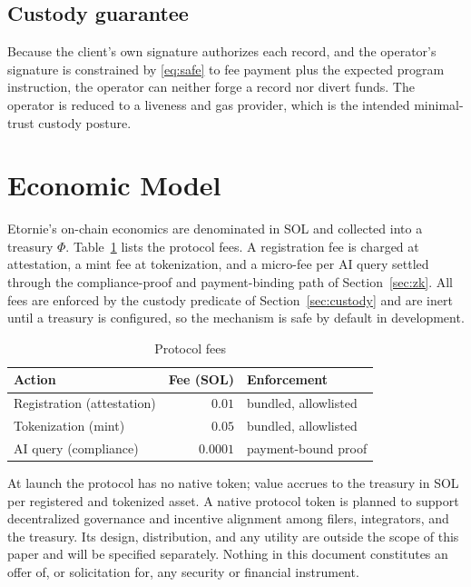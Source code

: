 \documentclass[conference]{IEEEtran}
\begin{document}
\subsection{Custody guarantee}

Because the client's own signature authorizes each record, and the operator's
signature is constrained by \eqref{eq:safe} to fee payment plus the expected
program instruction, the operator can neither forge a record nor divert funds.
The operator is reduced to a liveness and gas provider, which is the intended
minimal-trust custody posture.

\section{Economic Model}
\label{sec:econ}

Etornie's on-chain economics are denominated in SOL and collected into a
treasury $\Phi$. Table~\ref{tab:fees} lists the protocol fees. A registration
fee is charged at attestation, a mint fee at tokenization, and a micro-fee
per AI query settled through the compliance-proof and payment-binding path of
Section~\ref{sec:zk}. All fees are enforced by the custody predicate of
Section~\ref{sec:custody} and are inert until a treasury is configured, so the
mechanism is safe by default in development.

\begin{table}[t]
\caption{Protocol fees}
\label{tab:fees}
\centering
\begin{tabular}{@{}lrl@{}}
\toprule
Action & Fee (SOL) & Enforcement \\
\midrule
Registration (attestation) & $0.01$ & bundled, allowlisted \\
Tokenization (mint) & $0.05$ & bundled, allowlisted \\
AI query (compliance) & $0.0001$ & payment-bound proof \\
\bottomrule
\end{tabular}
\end{table}

At launch the protocol has no native token; value accrues to the treasury in
SOL per registered and tokenized asset. A native protocol token is planned to
support decentralized governance and incentive alignment among filers,
integrators, and the treasury. Its design, distribution, and any
utility are outside the scope of this paper and will be specified separately.
Nothing in this document constitutes an offer of, or solicitation for, any
security or financial instrument.
\end{document}
